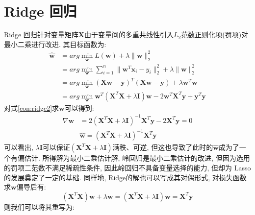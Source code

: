 \section{Ridge 回归}
Ridge 回归针对变量矩阵$\mathbf{X}$由于变量间的多重共线性引入$L_2$范数正则化项(罚项)对最小二乘进行改进. 其目标函数为:
\begin{equation}
\begin{aligned}
\boldsymbol{\hat{w}}&=arg\underset{\boldsymbol{w}}{\min}L\left( \boldsymbol{w} \right) +\lambda \lVert \boldsymbol{w} \rVert _{2}^{2} \\
&=arg\underset{\boldsymbol{w}}{\min}\sum_{i=1}^n{\lVert \boldsymbol{w}^T\boldsymbol{x}_i-y_i \rVert _{2}^{2}}+\lambda \lVert \boldsymbol{w} \rVert _{2}^{2}\\
&=arg\underset{\boldsymbol{w}}{\min}\left( \mathbf{X}\boldsymbol{w}-\mathbf{y} \right) ^T\left( \mathbf{X}\boldsymbol{w}-\mathbf{y} \right) +\lambda \boldsymbol{w}^T\boldsymbol{w}\\
&=arg\underset{\boldsymbol{w}}{\min}\boldsymbol{w}^T\left( \mathbf{X}^T\mathbf{X}+\lambda \mathbf{I} \right) \boldsymbol{w}-2\boldsymbol{w}^T\mathbf{X}^T\mathbf{y}+\mathbf{y}^T\mathbf{y}\label{con:ridge1}
\end{aligned}
\end{equation}
对式\eqref{con:ridge2}求$\boldsymbol{w}$可以得到:
\begin{equation}
\begin{aligned}
\nabla \boldsymbol{w}&=2\left( \mathbf{X}^T\mathbf{X}+\lambda \mathbf{I} \right) ^{-1}\mathbf{X}^T\mathbf{y}-2\mathbf{X}^T\mathbf{y}=0\\
&\boldsymbol{\hat{w}}=\left( \mathbf{X}^T\mathbf{X}+\lambda \mathbf{I} \right) ^{-1}\mathbf{X}^T\mathbf{y}
\end{aligned}
\end{equation}
可以看出, $\lambda \mathbf{I}$可以保证$\left( \mathbf{X}^T\mathbf{X}+\lambda \mathbf{I} \right)$满秩、可逆, 但这也导致了此时的$\boldsymbol{\hat{w}}$成为了一个有偏估计. 所得解为最小二乘估计解, 岭回归是最小二乘估计的改进, 但因为选用的罚项二范数不满足稀疏性条件, 因此岭回归不具备变量选择的能力, 但却为 Lasso 的发展奠定了一定的基础. 同样地, Ridge的解也可以写成其对偶形式, 对损失函数求$\boldsymbol{w}$偏导后有:
\begin{equation}
\left( \mathbf{X}^T\mathbf{X} \right) \boldsymbol{w}+\lambda \boldsymbol{w}=\left( \mathbf{X}^T\mathbf{X}+\lambda \mathbf{I} \right) \boldsymbol{w}=\mathbf{X}^T\mathbf{y} \label{con:ridge2}
\end{equation}
则我们可以将其重写为:
